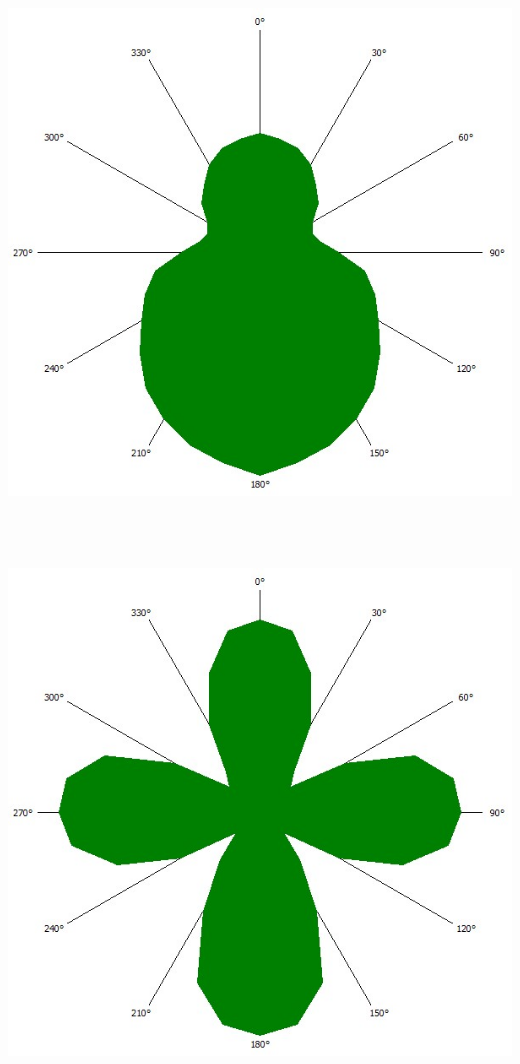 \documentclass[german,  %
parskip=full,  %
]{scrartcl}
\begin{document}
\begin{minipage}{0.4 \textwidth} \centering
\includegraphics[scale=0.3]{445_l2_mittlerer_Peak.jpg}
\end{minipage}
\\\\
\begin{minipage}{0.4 \textwidth} \centering
\includegraphics[scale=0.3]{445_l2_rechter_Peak.jpg}
\end{minipage}
\end{document}
